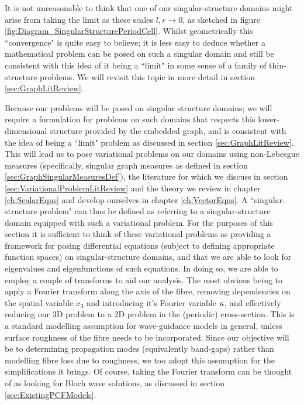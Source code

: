 It is not unreasonable to think that one of our singular-structure domains might arise from taking the limit as these scales $l,r\rightarrow0$, as sketched in figure \ref{fig:Diagram_SingularStructurePeriodCell}.
Whilst geometrically this ``convergence" is quite easy to believe; it is less easy to deduce whether a mathematical problem can be posed on such a singular domain and still be consistent with this idea of it being a ``limit" in some sense of a family of thin-structure problems.
We will revisit this topic in more detail in section \ref{sec:GraphLitReview}. \newline

Because our problems will be posed on singular structure domains; we will require a formulation for problems on such domains that respects this lower-dimensional structure provided by the embedded graph, and is consistent with the idea of being a ``limit" problem as discussed in section \ref{sec:GraphLitReview}.
This will lead us to pose variational problems on our domains using non-Lebesgue measures (specifically, singular graph measures as defined in section \ref{sec:GraphSingularMeasuresDef}), the literature for which we discuss in section \ref{sec:VariationalProblemLitReview} and the theory we review in chapter \ref{ch:ScalarEqns} and develop ourselves in chapter \ref{ch:VectorEqns}.
A ``singular-structure problem" can thus be defined as referring to a singular-structure domain equipped with such a variational problem.
For the purposes of this section it is sufficient to think of these variational problems as providing a framework for posing differential equations (subject to defining appropriate function spaces) on singular-structure domains, and that we are able to look for eigenvalues and eigenfunctions of such equations.
In doing so, we are able to employ a couple of transforms to aid our analysis.
The most obvious being to apply a Fourier transform along the axis of the fibre, removing dependencies on the spatial variable $x_3$ and introducing it's Fourier variable $\kappa$, and effectively reducing our 3D problem to a 2D problem in the (periodic) cross-section.
This is a standard modelling assumption for wave-guidance models in general, unless surface roughness of the fibre needs to be incorporated.
Since our objective will be to determining propagation modes (equivalently band-gaps) rather than modelling fibre loss due to roughness, we too adopt this assumption for the simplifications it brings.
Of course, taking the Fourier transform can be thought of as looking for Bloch wave solutions, as discussed in section \ref{sec:ExistingPCFModels}. \newline

